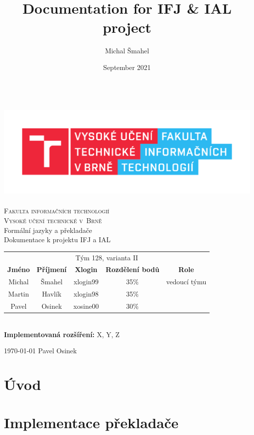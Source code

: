 \documentclass[11pt,a4paper]{article}
\title{Documentation for IFJ \& IAL project}
\author{Michal Šmahel}
\date{September 2021}
\begin{document}
\begin{titlepage}
    \begin{center}
        \includegraphics[height = 160pt]{images/FIT_logo.pdf}\\
		
		{\Huge \textsc{Fakulta informačních technologií}\\[5pt]}
		{\Huge \textsc{Vysoké učení technické v~Brně}}\\
		{\LARGE Formální jazyky a překladače\\[5pt]}
		{\LARGE Dokumentace k projektu IFJ a IAL\\[30pt]}
		
		\begin{tabular}{c c c c c}
		    \multicolumn{5}{c}{Tým 128, varianta II}\\[5pt]
            \textbf{Jméno} & \textbf{Příjmení} & \textbf{Xlogin} & \textbf{Rozdělení bodů} & \textbf{Role}\\
            \hline
            Michal & Šmahel & xlogin99 & 35\% & vedoucí týmu \\[5pt]
            Martin & Havlík & xlogin98 & 35\% &\\[5pt]
            Pavel & Osinek & xosine00 & 30\% & 
        \end{tabular}\\[30pt]
        \textbf{Implementovaná rozšíření:} X, Y, Z
    \end{center}
    {
		\today
		\hfill
		Pavel Osinek
	}
\end{titlepage}

\newpage
\tableofcontents
\newpage

\section{Úvod}
\section{Implementace překladače}
\end{document}
